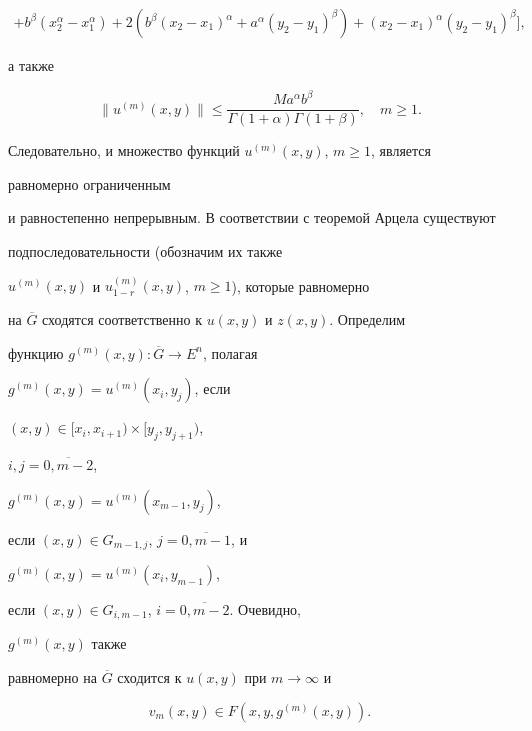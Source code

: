 \begin{pf}
\begin{gather}
% 


+b^\beta(x_2^\alpha-x_1^\alpha)+2(b^\beta(x_2-x_1)^\alpha+ 


a^\alpha(y_2-y_1)^\beta)+ 


(x_2-x_1)^\alpha(y_2-y_1)^\beta],\tag{26} 


\end{gather} 


а также 


\begin{equation} 


\|u^{(m)}(x,y)\|\le 


\frac{Ma^\alpha b^\beta}{\Gamma(1+\alpha)\Gamma(1+\beta)}, 


\quad m\ge 1. \tag{27}


\end{equation} 


Следовательно, и множество функций $u^{(m)}(x,y)$, $m\ge 1$, является 


равномерно ограниченным 


и равностепенно непрерывным. В соответствии с теоремой Арцела существуют 


подпоследовательности (обозначим их также 


$u^{(m)}(x,y)$ и $u^{(m)}_{1-r}(x,y)$, $m\ge 1$), которые равномерно 


на $\overline G$ сходятся соответственно к $u(x,y)$ и $z(x,y)$. Определим 


функцию $g^{(m)}(x,y):\overline G\to E^n$, полагая 


$g^{(m)}(x,y)=u^{(m)}(x_i,y_j)$, если 


$(x,y)\in[x_i,x_{i+1})\times[y_j,y_{j+1})$, 


$i,j=\overline{0,m-2}$, 


$g^{(m)}(x,y)=u^{(m)}(x_{m-1},y_j)$, 


если $(x,y)\in G_{m-1,j}$, $j=\overline{0,m-1}$, и 


$g^{(m)}(x,y)=u^{(m)}(x_i,y_{m-1})$, 


если $(x,y)\in G_{i,m-1}$, $i=\overline{0,m-2}$. Очевидно, 


$g^{(m)}(x,y)$ также 


равномерно на $\overline G$ сходится к $u(x,y)$ при $m\to\infty$ и 


\begin{equation} 


v_m(x,y)\in F(x,y,g^{(m)}(x,y)).\tag{28} 


\end{equation} 



\end{pf}
